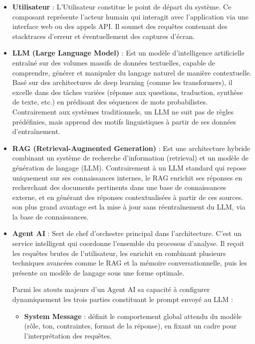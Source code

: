 \documentclass[12pt,a4paper]{report}
\begin{document}
	\begin{itemize}
		
		\item \textbf{Utilisateur} : L'Utilisateur constitue le point de départ du système. Ce composant représente l'acteur humain qui interagit avec l'application via une interface web ou des appels API. Il soumet des requêtes contenant des stacktraces d'erreur et éventuellement des captures d'écran.
		
		\item \textbf{LLM (Large Language Model)} : Est un modèle d'intelligence artificielle entraîné sur des volumes massifs de données textuelles, capable de comprendre, générer et manipuler du langage naturel de manière contextuelle. Basé sur des architectures de deep learning (comme les transformers), il excelle dans des tâches variées (réponse aux questions, traduction, synthèse de texte, etc.) en prédisant des séquences de mots probabilistes. Contrairement aux systèmes traditionnels, un LLM ne suit pas de règles prédéfinies, mais apprend des motifs linguistiques à partir de ses données d'entraînement.
		
		\item \textbf{RAG (Retrieval-Augmented Generation)} : Est une architecture hybride combinant un système de recherche d'information (retrieval) et un modèle de génération de langage (LLM). Contrairement à un LLM standard qui repose uniquement sur ses connaissances internes, le RAG enrichit ses réponses en recherchant des documents pertinents dans une base de connaissances externe, et en générant des réponses contextualisées à partir de ces sources. son plus grand avantage est la mise à jour sans réentraînement du LLM, via la base de connaissances.
		
		\item \textbf{Agent AI} : Sert de chef d'orchestre principal dans l'architecture. C'est un service intelligent qui coordonne l'ensemble du processus d'analyse. Il reçoit les requêtes brutes de l'utilisateur, les enrichit en combinant plusieurs techniques avancées comme le RAG et la mémoire conversationnelle, puis les présente au modèle de langage sous une forme optimale.
		
		Parmi les atouts majeurs d'un Agent AI sa capacité à configurer dynamiquement les trois parties constituant le prompt envoyé au LLM :
		
		\begin{itemize}
			
			\item \textbf{System Message} : définit le comportement global attendu du modèle (rôle, ton, contraintes, format de la réponse), en fixant un cadre pour l’interprétation des requêtes.
			

\end{itemize}
\end{itemize}
\end{document}
